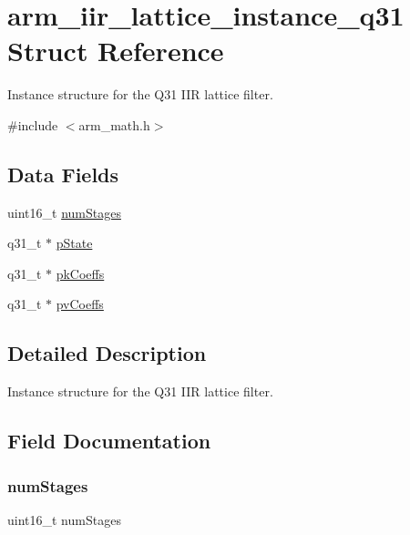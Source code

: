 \hypertarget{structarm__iir__lattice__instance__q31}{}\section{arm\+\_\+iir\+\_\+lattice\+\_\+instance\+\_\+q31 Struct Reference}
\label{structarm__iir__lattice__instance__q31}


Instance structure for the Q31 I\+IR lattice filter.  




{\ttfamily \#include $<$arm\+\_\+math.\+h$>$}

\subsection*{Data Fields}
\begin{DoxyCompactItemize}
\item 
uint16\+\_\+t \mbox{\hyperlink{structarm__iir__lattice__instance__q31_a4cceb90547b3e585d4c7aabaa8057212}{num\+Stages}}
\item 
q31\+\_\+t $\ast$ \mbox{\hyperlink{structarm__iir__lattice__instance__q31_adee4ba3ee8869865af7d8fa08ca913d6}{p\+State}}
\item 
q31\+\_\+t $\ast$ \mbox{\hyperlink{structarm__iir__lattice__instance__q31_a9d45339bf841bf86aec57be5f70d2b01}{pk\+Coeffs}}
\item 
q31\+\_\+t $\ast$ \mbox{\hyperlink{structarm__iir__lattice__instance__q31_a3d7de56fe9de3458f033a64f14407533}{pv\+Coeffs}}
\end{DoxyCompactItemize}


\subsection{Detailed Description}
Instance structure for the Q31 I\+IR lattice filter. 

\subsection{Field Documentation}
\mbox{\label{structarm__iir__lattice__instance__q31_a4cceb90547b3e585d4c7aabaa8057212}} 
\subsubsection{\texorpdfstring{numStages}{numStages}}
{\footnotesize\ttfamily uint16\+\_\+t num\+Stages}


